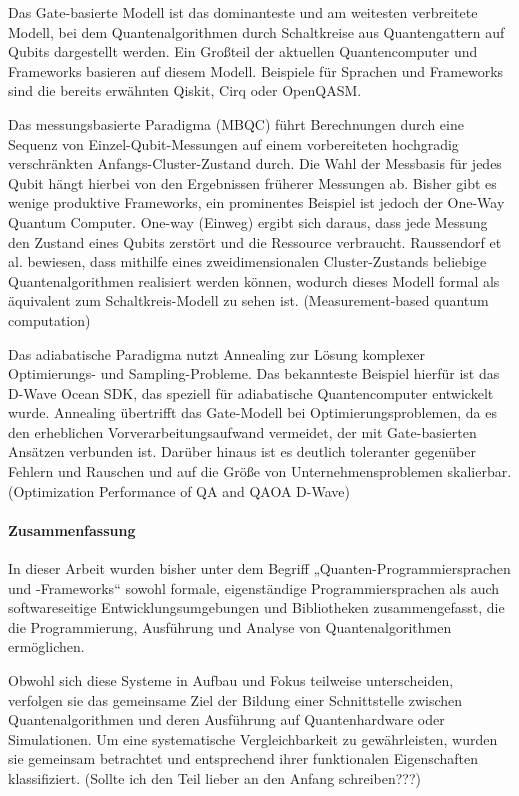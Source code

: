 Das Gate-basierte Modell ist das dominanteste und am weitesten verbreitete Modell, bei dem Quantenalgorithmen durch Schaltkreise aus Quantengattern auf Qubits dargestellt werden. Ein Großteil der aktuellen Quantencomputer und Frameworks basieren auf diesem Modell. Beispiele für Sprachen und Frameworks sind die bereits erwähnten Qiskit, Cirq oder OpenQASM. 

Das messungsbasierte Paradigma (MBQC) führt Berechnungen durch eine Sequenz von Einzel-Qubit-Messungen auf einem vorbereiteten hochgradig verschränkten Anfangs-Cluster-Zustand durch. Die Wahl der Messbasis für jedes Qubit hängt hierbei von den Ergebnissen früherer Messungen ab. Bisher gibt es wenige produktive Frameworks, ein prominentes Beispiel ist jedoch der One-Way Quantum Computer. One-way (Einweg) ergibt sich daraus, dass jede Messung den Zustand eines Qubits zerstört und die Ressource verbraucht. Raussendorf et al. bewiesen, dass mithilfe eines zweidimensionalen Cluster-Zustands beliebige Quantenalgorithmen realisiert werden können, wodurch dieses Modell formal als äquivalent zum Schaltkreis-Modell zu sehen ist. (Measurement-based quantum computation)

Das adiabatische Paradigma nutzt Annealing zur Lösung komplexer Optimierungs- und Sampling-Probleme. Das bekannteste Beispiel hierfür ist das D-Wave Ocean SDK, das speziell für adiabatische Quantencomputer entwickelt wurde. Annealing übertrifft das Gate-Modell bei Optimierungsproblemen, da es den erheblichen Vorverarbeitungsaufwand vermeidet, der mit Gate-basierten Ansätzen verbunden ist. Darüber hinaus ist es deutlich toleranter gegenüber Fehlern und Rauschen und auf die Größe von Unternehmensproblemen skalierbar. (Optimization Performance of QA and QAOA D-Wave)


\paragraph{Zusammenfassung} 
In dieser Arbeit wurden bisher unter dem Begriff „Quanten-Programmiersprachen und -Frameworks“ sowohl formale, eigenständige Programmiersprachen als auch softwareseitige Entwicklungsumgebungen und Bibliotheken zusammengefasst, die die Programmierung, Ausführung und Analyse von Quantenalgorithmen ermöglichen.

Obwohl sich diese Systeme in Aufbau und Fokus teilweise unterscheiden, verfolgen sie das gemeinsame Ziel der Bildung einer Schnittstelle zwischen Quantenalgorithmen und deren Ausführung auf Quantenhardware oder Simulationen. Um eine systematische Vergleichbarkeit zu gewährleisten, wurden sie gemeinsam betrachtet und entsprechend ihrer funktionalen Eigenschaften klassifiziert. (Sollte ich den Teil lieber an den Anfang schreiben???)

